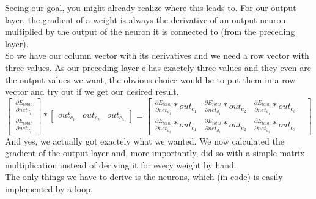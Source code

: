 \documentclass[11pt, halfparskip]{article}
\begin{document}
    \noindent \newline
    Seeing our goal, you might already realize where this leads to. For our output layer, the gradient of a weight is always the derivative of an output neuron multiplied by the output of
    the neuron it is connected to (from the preceding layer).\\
    So we have our column vector with its derivatives and we need a row vector with three values. As our preceding layer c has exactely three values and they even are the output
    values we want, the obvious choice would be to put them in a row vector and try out if we get our desired result.
    \[
    	\begin{bmatrix}
    		\frac{\partial E_{total}}{\partial net_{d_1}}\\
    		\frac{\partial E_{total}}{\partial net_{d_2}}
    	\end{bmatrix}
    	*
    	\begin{bmatrix}
    		out_{c_1} & out_{c_2} & out_{c_3}
    	\end{bmatrix}
    	=
    	\begin{bmatrix}
	    	\frac{\partial E_{total}}{\partial net_{d_1}} * out_{c_1} & 
    		\frac{\partial E_{total}}{\partial net_{d_1}} * out_{c_2} & 
    		\frac{\partial E_{total}}{\partial net_{d_1}} * out_{c_3} & \\
    		\frac{\partial E_{total}}{\partial net_{d_2}} * out_{c_1} &
    		\frac{\partial E_{total}}{\partial net_{d_2}} * out_{c_2} & 
    		\frac{\partial E_{total}}{\partial net_{d_2}} * out_{c_3}
    	\end{bmatrix}
    \]
    And yes, we actually got exactely what we wanted. We now calculated the gradient of the output layer and, more importantly, did so with a simple matrix multiplication instead of
    deriving it for every weight by hand.\\
    The only things we have to derive is the neurons, which (in code) is easily implemented by a loop.
    
\end{document}
